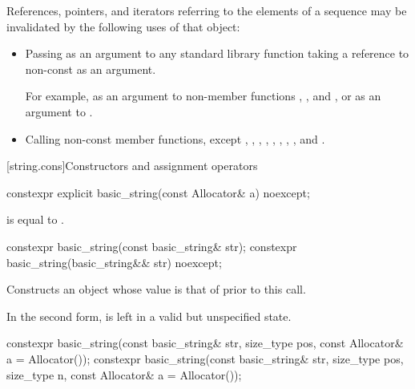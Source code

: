 \pnum
References, pointers, and iterators referring to the elements of a
 sequence may be
invalidated by the following uses of that  object:

\begin{itemize}
\item Passing as an argument to any standard library function taking a reference to non-const
 as an argument.
\begin{footnote}
For example, as an argument to non-member
functions ,
, and , or as
an argument to .
\end{footnote}

\item Calling non-const member functions, except
,
,
,
,
,
,
,
,
and
.
\end{itemize}

[string.cons]{Constructors and assignment operators}

%
\begin{itemdecl}
constexpr explicit basic_string(const Allocator& a) noexcept;
\end{itemdecl}

\begin{itemdescr}

\pnum
\ensures
{} is equal to .
\end{itemdescr}

%
\begin{itemdecl}
constexpr basic_string(const basic_string& str);
constexpr basic_string(basic_string&& str) noexcept;
\end{itemdecl}

\begin{itemdescr}
\pnum
\effects
Constructs an object whose
value is that of  prior to this call.

\pnum
\remarks
In the second form,  is left in a valid but unspecified state.
\end{itemdescr}

%
\begin{itemdecl}
constexpr basic_string(const basic_string& str, size_type pos,
                       const Allocator& a = Allocator());
constexpr basic_string(const basic_string& str, size_type pos, size_type n,
                       const Allocator& a = Allocator());
\end{itemdecl}

